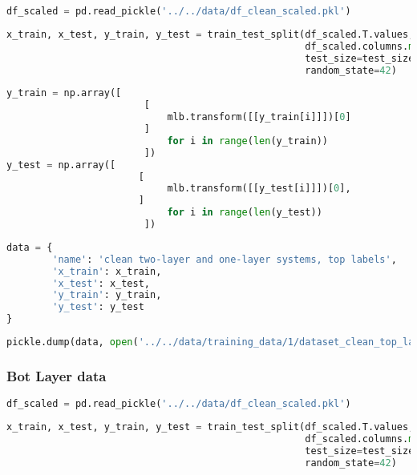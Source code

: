 \begin{lstlisting}[language=Python]
df_scaled = pd.read_pickle('../../data/df_clean_scaled.pkl')
\end{lstlisting}

\begin{lstlisting}[language=Python]
x_train, x_test, y_train, y_test = train_test_split(df_scaled.T.values,
                                                    df_scaled.columns.map(lambda x: x.split('_')[0]), # first part of the filename is the top label
                                                    test_size=test_size_ratio,
                                                    random_state=42)
\end{lstlisting}

\begin{lstlisting}[language=Python]
y_train = np.array([    
                        [
                            mlb.transform([[y_train[i]]])[0]
                        ] 
                            for i in range(len(y_train))
                        ])
y_test = np.array([ 
                       [
                            mlb.transform([[y_test[i]]])[0],
                       ] 
                            for i in range(len(y_test))
                        ])
\end{lstlisting}

\begin{lstlisting}[language=Python]
data = {
        'name': 'clean two-layer and one-layer systems, top labels',
        'x_train': x_train,
        'x_test': x_test,
        'y_train': y_train,
        'y_test': y_test
}
\end{lstlisting}

\begin{lstlisting}[language=Python]
pickle.dump(data, open('../../data/training_data/1/dataset_clean_top_layer.pkl', 'wb'))
\end{lstlisting}

\hypertarget{bot-layer-data-2}{%
\subsubsection*{Bot Layer data}\label{bot-layer-data-2}}

\begin{lstlisting}[language=Python]
df_scaled = pd.read_pickle('../../data/df_clean_scaled.pkl')
\end{lstlisting}

\begin{lstlisting}[language=Python]
x_train, x_test, y_train, y_test = train_test_split(df_scaled.T.values,
                                                    df_scaled.columns.map(lambda x: x.split('_')[1]), # second part of the filename is the bot label
                                                    test_size=test_size_ratio,
                                                    random_state=42)
\end{lstlisting}

